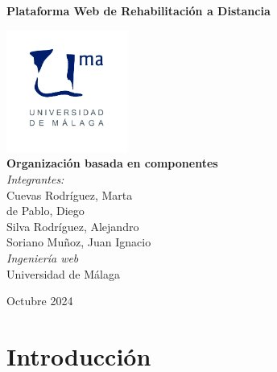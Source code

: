 \documentclass{article}
\begin{document}
	
	\begin{titlepage}
		\centering
		\vspace*{3cm}
		
		{\Huge \textbf{Plataforma Web de Rehabilitación a Distancia}\\[0.5cm]}
		
		\vspace{2cm}
		\includegraphics[width=0.3\textwidth]{images/uma_logo.jpg}\\[1cm]
		
		{\LARGE \textbf{Organización basada en componentes}\\[0.5cm]}
		{\large \textit{Integrantes:}\\
			Cuevas Rodríguez, Marta\\
			de Pablo, Diego\\
			Silva Rodríguez, Alejandro\\
			Soriano Muñoz, Juan Ignacio\\
		}
		\vfill
		{\large \textit{Ingeniería web}\\
			Universidad de Málaga\\
		}
		
		\vfill
		
		{\large Octubre 2024}
	\end{titlepage}
	
	\tableofcontents
	
	\newpage
	
	\section{Introducción}
\end{document}
